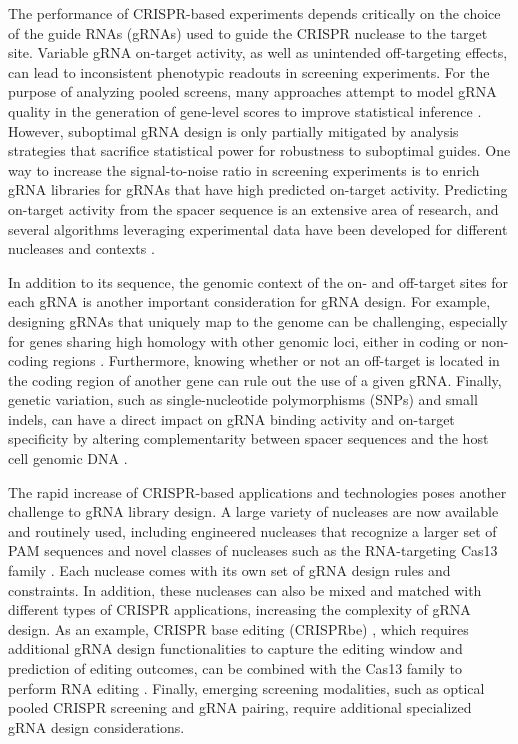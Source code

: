 \documentclass[pdftex,english,10pt]{article}
\begin{document}
The performance of CRISPR-based experiments depends critically on the choice of the guide RNAs (gRNAs) used to guide the CRISPR nuclease to the target site.
Variable gRNA on-target activity, as well as unintended off-targeting effects, can lead to inconsistent phenotypic readouts in screening experiments. 
For the purpose of analyzing pooled screens, many approaches attempt to model gRNA quality in the generation of gene-level scores to improve statistical inference \citep{ceres, bagel2, chronos, jacks, mageckmle}. However, suboptimal gRNA design is only partially mitigated by analysis strategies that sacrifice statistical power for robustness to suboptimal guides. One way to increase the signal-to-noise ratio in screening experiments is to enrich gRNA libraries for gRNAs that have high predicted on-target activity.  Predicting on-target activity from the spacer sequence is an extensive area of research, and several algorithms leveraging experimental data have been developed for different nucleases and contexts \citep{doench2016optimized, doench2014rational,azimuth,deepcas9, deepcpf1,toronto, crisprscan, crispria}. 

In addition to its sequence, the genomic context of the on- and off-target sites for each gRNA is another important consideration for gRNA design. For example, designing gRNAs that uniquely map to the genome can be challenging, especially for genes sharing high homology with other genomic loci, either in coding or non-coding regions \citep{fortin2019}. Furthermore, knowing whether or not an off-target is located in the coding region of another gene can rule out the use of a given gRNA. Finally, genetic variation, such as single-nucleotide polymorphisms (SNPs) and small indels, can have a direct impact on gRNA binding activity and on-target specificity by altering complementarity between spacer sequences and the host cell genomic DNA \citep{scott2017implications, lessard2017human, canver2017variant, wang2018genetic}.


The rapid increase of CRISPR-based applications and technologies poses another challenge to gRNA library design.
A large variety of nucleases are now available and routinely used, including engineered nucleases that recognize a larger set of PAM sequences  \citep{xcas9,spcas9ng, spg, enpamgb} and novel classes of nucleases such as the RNA-targeting Cas13 family \citep{c2c2_1, c2c2_2,cas13d}. Each nuclease comes with its own set of gRNA design rules and constraints. In addition, these nucleases can also be mixed and matched with different types of CRISPR applications, increasing the complexity of gRNA design. As an example, CRISPR base editing (CRISPRbe) \citep{gaudelli,komor}, which requires additional gRNA design functionalities to capture the editing window and prediction of editing outcomes, can be combined with the Cas13 family to perform RNA editing \citep{rnaediting1}. Finally, emerging screening modalities, such as optical pooled CRISPR screening \citep{ops} and gRNA pairing, require additional specialized gRNA design considerations. 
\end{document}
